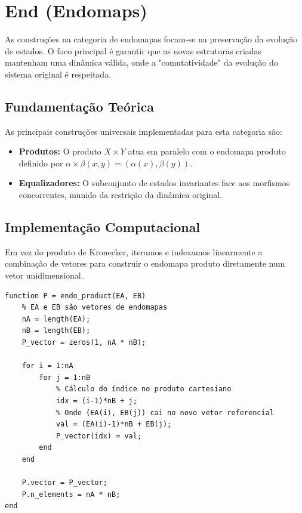 \section{End (Endomaps)}
As construções na categoria de endomapas focam-se na preservação da evolução de estados. O foco principal é garantir que as novas estruturas criadas mantenham uma dinâmica válida, onde a "comutatividade" da evolução do sistema original é respeitada.

\subsection{Fundamentação Teórica}
As principais construções universais implementadas para esta categoria são:
\begin{itemize}
    \item \textbf{Produtos:} O produto $X \times Y$ atua em paralelo com o endomapa produto definido por $\alpha \times \beta (x, y) = (\alpha(x), \beta(y))$.
    \item \textbf{Equalizadores:} O subconjunto de estados invariantes face aos morfismos concorrentes, munido da restrição da dinâmica original.
\end{itemize}

\subsection{Implementação Computacional}
Em vez do produto de Kronecker, iteramos e indexamos linearmente a combinação de vetores para construir o endomapa produto diretamente num vetor unidimensional.

\begin{lstlisting}[caption={Construção do Produto Paralelo de Endomapas}]
function P = endo_product(EA, EB)
    % EA e EB são vetores de endomapas
    nA = length(EA);
    nB = length(EB);
    P_vector = zeros(1, nA * nB);
    
    for i = 1:nA
        for j = 1:nB
            % Cálculo do índice no produto cartesiano
            idx = (i-1)*nB + j;
            % Onde (EA(i), EB(j)) cai no novo vetor referencial
            val = (EA(i)-1)*nB + EB(j);
            P_vector(idx) = val;
        end
    end
    
    P.vector = P_vector;
    P.n_elements = nA * nB;
end
\end{lstlisting}